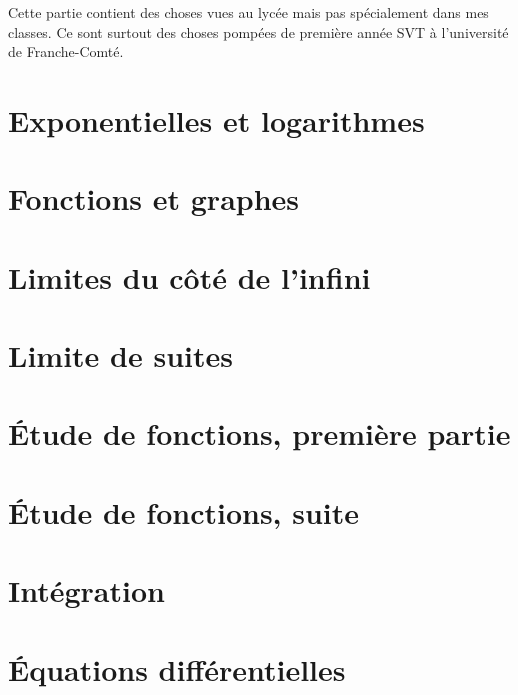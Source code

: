Cette partie contient des choses vues au lycée mais pas spécialement dans mes classes. Ce sont surtout des choses pompées de première année SVT à l'université de Franche-Comté.





\section{Exponentielles et logarithmes}

\section{Fonctions et graphes}


\section{Limites du côté de l'infini}

\section{Limite de suites}


\section{Étude de fonctions, première partie}

\section{Étude de fonctions, suite}

\section{Intégration}


\section{Équations différentielles}

